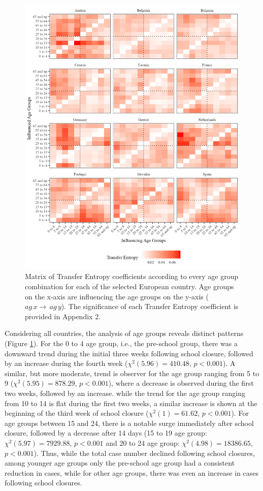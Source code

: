 \documentclass[]{interact}
\theoremstyle{plain}%
\theoremstyle{definition}
\theoremstyle{remark}
\begin{document}
\begin{figure}[H]
\includegraphics[width=\textwidth]{manuscript_blind_files/figure-latex/te-1} \caption{Matrix of Transfer Entropy coefficients according to every age group combination for each of the selected European country. Age groups on the x-axis are influencing the age groups on the y-axis (\(ag\,x \rightarrow\,ag\,y\)). The significance of each Transfer Entropy coefficient is provided in Appendix 2.}\label{fig:te}
\end{figure}

Considering all countries, the analysis of age groups reveals distinct patterns (Figure \ref{fig:te}). For the 0 to 4 age group, i.e., the pre-school group, there was a downward trend during the initial three weeks following school closure, followed by an increase during the fourth week (\(\chi^2(5.96) = 410.48\), \(p < 0.001\)). A similar, but more moderate, trend is observer for the age group ranging from 5 to 9 (\(\chi^2(5.95) = 878.29\), \(p < 0.001\)), where a decrease is observed during the first two weeks, followed by an increase. while the trend for the age group ranging from 10 to 14 is flat during the first two weeks, a similar increase is shown at the beginning of the third week of school closure (\(\chi^2(1) = 61.62\), \(p < 0.001\)). For age groups between 15 and 24, there is a notable surge immediately after school closure, followed by a decrease after 14 days (15 to 19 age group: \(\chi^2(5.97) = 7929.88\), \(p < 0.001\) and 20 to 24 age group: \(\chi^2(4.98) = 18386.65\), \(p < 0.001\)). Thus, while the total case number declined following school closures, among younger age groups only the pre-school age group had a consistent reduction in cases, while for other age groups, there was even an increase in cases following school closures.
\end{document}
